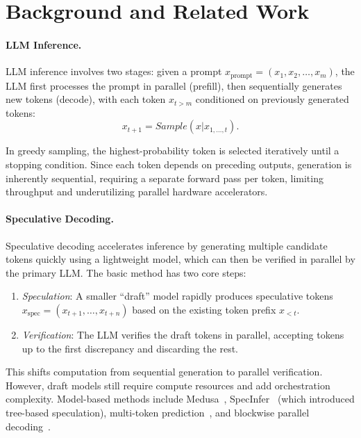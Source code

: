 \section{Background and Related Work}

\paragraph{LLM Inference.}

LLM inference involves two stages: given a prompt $x_{\text{prompt}} = (x_1, x_2, \dots, x_m)$, the LLM first processes the prompt in parallel (prefill), then sequentially generates new tokens (decode), with each token $x_{t>m}$ conditioned on previously generated tokens:
$$
x_{t+1} = Sample(x | x_{1, \ldots, t}).
$$

In greedy sampling, the highest-probability token is selected iteratively until a stopping condition. Since each token depends on preceding outputs, generation is inherently sequential, requiring a separate forward pass per token, limiting throughput and underutilizing parallel hardware accelerators.

\paragraph{Speculative Decoding.}

Speculative decoding \citep{leviathan23} accelerates inference by generating multiple candidate tokens quickly using a lightweight model, which can then be verified in parallel by the primary LLM. The basic method has two core steps:

\begin{enumerate}
\item \emph{Speculation}: A smaller ``draft'' model rapidly produces speculative tokens $x_{\text{spec}} = (x_{t+1}, \dots, x_{t+n})$ based on the existing token prefix $x_{<t}$.

\item \emph{Verification}: The LLM verifies the draft tokens in parallel, accepting tokens up to the first discrepancy and discarding the rest.
\end{enumerate}

This shifts computation from sequential generation to parallel verification. However, draft models still require compute resources and add orchestration complexity. Model-based methods include Medusa~\citep{cai2024medusasimplellminference}, SpecInfer~\citep{specinfer} (which introduced tree-based speculation), multi-token prediction~\citep{gloeckle2024multitoken}, and blockwise parallel decoding~\citep{stern2018blockwise,kim2024accelerating}.

